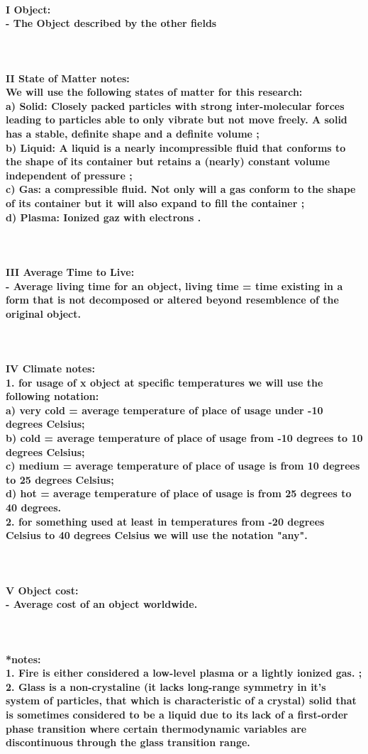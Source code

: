 \documentclass[12px]{article}
\newcommand{\aparagraph}[1]{\paragraph{#1}\mbox{}\\}
\begin{document}
\aparagraph{I Object: \\
- The Object described by the other fields}
\aparagraph{II State of Matter notes: \\
We will use the following states of matter for this research: \\
   a) Solid: Closely packed particles  with strong inter-molecular forces leading to particles able to only vibrate but not move freely. A solid has a stable, definite shape and a definite volume \parencite{solids}; \\
   b) Liquid: A liquid is a nearly incompressible fluid that conforms to the shape of its container but retains a (nearly) constant volume independent of pressure \parencite{liquids}; \\
   c) Gas: a compressible fluid. Not only will a gas conform to the shape of its container but it will also expand to fill the container \parencite{gases} ; \\
   d) Plasma: Ionized gaz with electrons \parencite{plasma}. }
\aparagraph{III Average Time to Live: \\
   - Average living time for an object, living time = time existing in a form that is not decomposed or altered beyond resemblence of the original object.}
\aparagraph{IV Climate notes: \\
1. for usage of x object at specific temperatures we will use the following notation: \\
   a) very cold = average temperature of place of usage under -10 degrees Celsius; \\
   b) cold = average temperature of place of usage from -10 degrees to 10 degrees Celsius; \\
   c) medium = average temperature of place of usage is from 10 degrees to 25 degrees Celsius; \\
   d) hot = average temperature of place of usage is from 25 degrees to 40 degrees. \\
2. for something used at least in temperatures from -20 degrees Celsius to 40 degrees Celsius we will use the notation "any".}
\aparagraph{V Object cost:  \\
   - Average cost of an object worldwide.}
\aparagraph{*notes: \\
 1. Fire is either considered a low-level plasma or a lightly ionized gas. \parencite{firedef}; \\
 2. Glass is a non-crystaline (it lacks long-range symmetry in it's system of particles, that which is characteristic of a crystal) solid that is sometimes considered to be a liquid due to its lack of a first-order phase transition where certain thermodynamic variables are discontinuous through the glass transition range. \parencite {glassdef} }

\printbibliography
\end{document}
